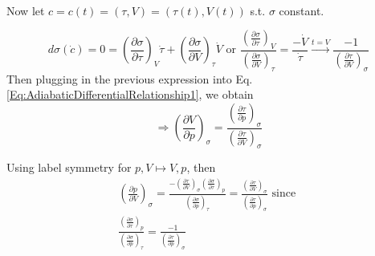 \documentclass[10pt]{amsart}
\begin{document}
\begin{multicols*}{2}
\quad \\
Now let $c=c(t) = (\tau, V) = (\tau(t), V(t))$ s.t. $\sigma$ constant.

\[
d\sigma(\dot{c}) = 0 = \left( \frac{\partial \sigma}{\partial \tau} \right)_V \dot{\tau} + \left( \frac{\partial \sigma}{\partial V} \right)_{\tau} \dot{V} \text{ or } \frac{ \left( \frac{\partial \sigma}{\partial \tau}\right)_V }{ \left( \frac{\partial \sigma}{\partial V}\right)_{\tau} } = \frac{  - \dot{V}}{\dot{\tau}} \xrightarrow{ t = V} \frac{-1}{ \left( \frac{\partial \tau}{\partial V} \right)_{\sigma} }
\]
Then plugging in the previous expression into Eq. \ref{Eq:AdiabaticDifferentialRelationship1}, we obtain
\begin{equation}\label{Eq:AdiabaticCompressionOfV}
\Longrightarrow \left( \frac{\partial V}{ \partial p} \right)_{\sigma} = \frac{ \left( \frac{\partial \tau }{\partial p} \right)_{\sigma} }{ \left( \frac{\partial \tau}{\partial V} \right)_{\sigma} }
\end{equation}

Using label symmetry for $p, V \mapsto V, p$, then
\[
\begin{gathered}
\left( \frac{\partial p}{\partial V} \right)_{\sigma} =  \frac{ - \left( \frac{\partial \tau}{\partial V} \right)_{\sigma} \left( \frac{\partial \sigma}{\partial \tau}\right)_p }{ \left( \frac{\partial \sigma}{\partial p}\right)_{\tau} } = \frac{ \left( \frac{\partial \tau }{\partial V} \right)_{\sigma} }{ \left( \frac{\partial \tau}{\partial p} \right)_{\sigma} } \text{ since } \\
\frac{ \left( \frac{\partial \sigma}{\partial \tau}\right)_p }{ \left( \frac{\partial \sigma}{\partial p}\right)_{\tau} } = \frac{-1}{ \left( \frac{\partial \tau}{\partial p} \right)_{\sigma} }
\end{gathered}
\]


\end{multicols*}
\end{document}

